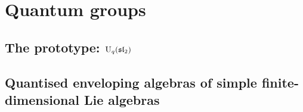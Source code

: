 \section{Quantum groups}
    \subsection{The prototype: \texorpdfstring{$\mathrm{U}_q(\mathfrak{sl}_2)$}{}}
    
    \subsection{Quantised enveloping algebras of simple finite-dimensional Lie algebras}